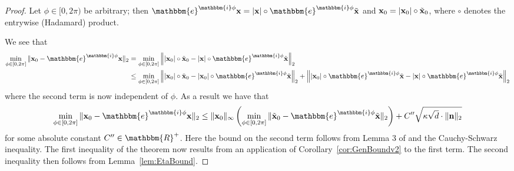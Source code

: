 \begin{proof}

Let $\phi \in [0,2 \pi)$ be arbitrary;  %
then $\mathbbm{e}^{\mathbbm{i} \phi }\x = |\x| \circ \mathbbm{e}^{\mathbbm{i} \phi} \tilde{\x}$ and $\mathbf x_0 = |\mathbf x_0| \circ \tilde{\mathbf x}_0$, where $\circ$ denotes the entrywise (Hadamard) product.

We see that%
\begin{align*}
\min_{\phi \in [0, 2 \pi]} \| \x_0 - \mathbbm{e}^{\mathbbm{i} \phi }\x \|_2 &= \min_{\phi \in [0, 2 \pi]} \left\| |\x_0| \circ \tilde{\x}_0 - |\x| \circ \mathbbm{e}^{\mathbbm{i} \phi} \tilde{\x} \right\|_2 \\
&\leq \min_{\phi \in [0, 2 \pi]} \left\| |\x_0| \circ \tilde{\x}_0 - |\x_0| \circ \mathbbm{e}^{\mathbbm{i} \phi} \tilde{\x}  \right\|_2 + \left\| |\x_0| \circ \mathbbm{e}^{\mathbbm{i} \phi} \tilde{\x}  - |\x| \circ \mathbbm{e}^{\mathbbm{i} \phi} \tilde{\x}  \right\|_2 
\end{align*}
where the second term is now independent of $\phi$.  As a result we have that
\begin{equation*}
\min_{\phi \in [0, 2 \pi]} \| \x_0 - \mathbbm{e}^{\mathbbm{i} \phi }\x \|_2 \leq \| \x_0 \|_{\infty} \left( \min_{\phi \in [0, 2 \pi]} \| \tilde{\x}_0 - \mathbbm{e}^{\mathbbm{i} \phi} \tilde{\x} \|_2 \right) + C'' \sqrt{\kappa \sqrt{d} \cdot \| \n \|_2 }
\end{equation*}
for some absolute constant $C'' \in \mathbbm{R}^+$.  Here the bound on the second term follows from Lemma 3 of \cite{IVW2015_FastPhase} and the Cauchy-Schwarz inequality.  %
%
%
The first inequality of the theorem now results from an application of Corollary~\ref{cor:GenBoundv2} to the first term.  The second inequality then follows from Lemma~\ref{lem:EtaBound}.
\end{proof}

